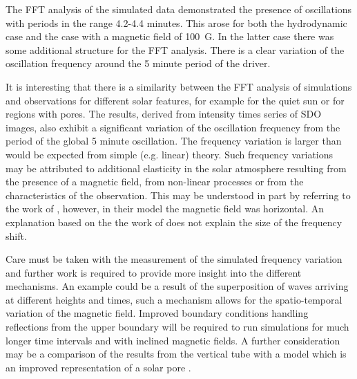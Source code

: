 \documentclass[physics,article,submit,pdftex,moreauthors]{Definitions/mdpi}
\begin{document}
The FFT analysis of the simulated data demonstrated the presence of oscillations with periods in the range 4.2-4.4 minutes. This arose for both the hydrodynamic case and the case with a magnetic field of 100~G. In  the latter case there was some additional structure for the FFT analysis. There is a clear variation of the oscillation frequency around the 5 minute period of the driver. 

It is interesting that there is a similarity between the FFT analysis  of simulations and observations for different solar features, for example for the quiet sun or for regions with pores. The results, derived from intensity times series of SDO images, also exhibit a significant variation of the oscillation frequency from the period of the global 5 minute oscillation.  The frequency variation is larger than would be expected from  simple (e.g. linear) theory. Such frequency variations may be attributed to additional elasticity in the solar atmosphere resulting from the presence of a magnetic field, from non-linear processes or from the characteristics of the observation. This  may be understood in part by referring to the work of \cite{Campbell1989} , however, in their model the magnetic field was horizontal. An explanation based on the the work of \cite{Hindman1996} does not explain the size of the frequency shift.

 
  
  

 
 
Care must be taken with the measurement of the simulated frequency variation and further work is required to provide more insight into the different mechanisms. An example could be a result of the superposition of waves arriving at different heights and times, such a mechanism allows for the spatio-temporal variation of the   magnetic field. Improved boundary conditions handling reflections from the upper boundary  will be required to run simulations for much longer time intervals and with inclined magnetic fields. A further consideration may be a comparison of the results from the vertical tube with a model which is an improved representation of a solar pore \cite{Simon1970} \cite{Cameron2007}.
\end{document}
